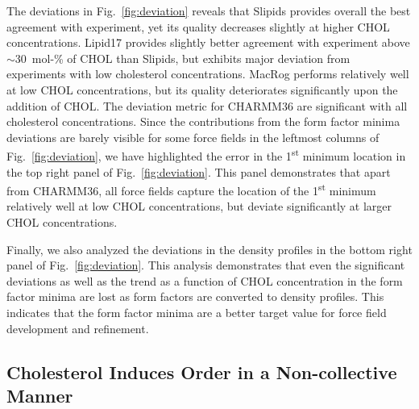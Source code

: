 \documentclass[journal=jctcce]{achemso}
\begin{document}
The deviations in Fig.~\ref{fig:deviation} 
reveals that Slipids provides overall the best agreement with experiment, yet its quality decreases slightly at higher CHOL concentrations.
Lipid17 provides slightly better agreement with experiment above $\sim$30~mol-\% of CHOL than Slipids, but exhibits major deviation from experiments with low cholesterol concentrations. 
MacRog performs relatively well at low CHOL concentrations, but its quality deteriorates significantly upon the addition of CHOL. The deviation metric for CHARMM36 are significant with all cholesterol concentrations. 
%
Since the contributions from the form factor minima deviations are barely visible for some force fields in the leftmost columns of Fig.~\ref{fig:deviation}, we have highlighted the error in the 1\textsuperscript{st} minimum location in the top right panel of Fig.~\ref{fig:deviation}. This panel demonstrates that apart from CHARMM36, all force fields capture the location of the 1\textsuperscript{st} minimum relatively well at low CHOL concentrations, but deviate significantly at larger CHOL concentrations. 

Finally, we also analyzed the deviations in the density profiles in the bottom right panel of Fig.~\ref{fig:deviation}. This analysis demonstrates that even the significant deviations as well as the trend as a function of CHOL concentration in the form factor minima are lost as form factors are converted to density profiles. This indicates that the form factor minima are a better target value for force field development and refinement.

\subsection{Cholesterol Induces Order in a Non-collective Manner}
\end{document}
